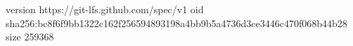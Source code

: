version https://git-lfs.github.com/spec/v1
oid sha256:bc8f6f9bb1322c162f256594893198a4bb9b5a4736d3ce3446c470f068b44b28
size 259368
